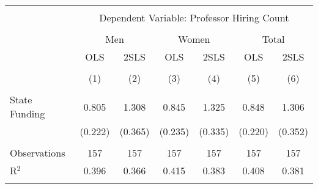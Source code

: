 
\begin{tabular}{@{\extracolsep{5pt}}lcccccc} 
\\[-1.8ex]\hline 
\hline \\[-1.8ex] 
 & \multicolumn{6}{c}{Dependent Variable: Professor Hiring Count} \\ 
\cline{2-7} 
\\[-1.8ex] & \multicolumn{2}{c}{Men} & \multicolumn{2}{c}{Women} & \multicolumn{2}{c}{Total} \\ 
 & OLS & 2SLS & OLS & 2SLS & OLS & 2SLS \\ 
\\[-1.8ex] & (1) & (2) & (3) & (4) & (5) & (6)\\ 
\hline \\[-1.8ex] 
 State Funding & 0.805 & 1.308 & 0.845 & 1.325 & 0.848 & 1.306 \\ 
  & (0.222) & (0.365) & (0.235) & (0.335) & (0.220) & (0.352) \\ 
 \hline \\[-1.8ex] 
Observations & 157 & 157 & 157 & 157 & 157 & 157 \\ 
R$^{2}$ & 0.396 & 0.366 & 0.415 & 0.383 & 0.408 & 0.381 \\ 
\hline 
\hline \\[-1.8ex] 
\end{tabular} 
